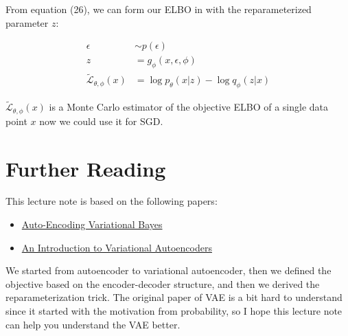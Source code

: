 \documentclass[11pt]{article}
\theoremstyle{definition}
\begin{document}
From equation (26), we can form our ELBO in with the reparameterized parameter $z$:

\begin{align}
    \epsilon &\sim p(\epsilon)\\
    z &= g_\phi(x, \epsilon, \phi)\\
    \mathcal{\tilde{L}}_{\theta, \phi}(x) &= \log p_\theta(x|z) - \log q_\phi(z|x)
\end{align}

$\mathcal{\tilde{L}}_{\theta, \phi}(x)$ is a Monte Carlo estimator of the objective ELBO of a single data point $x$ now we could use it for SGD.

\section{Further Reading}

This lecture note is based on the following papers:

\begin{itemize}
    \item \href{https://arxiv.org/abs/1312.6114}{Auto-Encoding Variational Bayes}
    \item \href{https://arxiv.org/abs/1906.02691}{An Introduction to Variational Autoencoders}
\end{itemize}

We started from autoencoder to variational autoencoder, then we defined the objective based on the encoder-decoder structure, and then we derived the reparameterization trick. The original paper of VAE is a bit hard to understand since it started with the motivation from probability, so I hope this lecture note can help you understand the VAE better.
\end{document}
